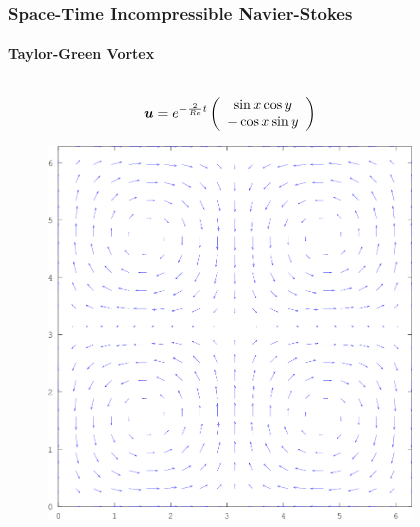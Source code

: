 \documentclass[18pt,xcolor=table]{beamer}
\begin{document}
\begin{frame}[t]
\frametitle{Space-Time Incompressible Navier-Stokes}
\framesubtitle{Taylor-Green Vortex}
\vspace{-7ex}
\begin{columns}
\begin{column}{0.4\textwidth}
\[
\boldsymbol u=e^{-\frac{2}{Re}t}\left( \begin{array}{c} \sin{x}\cos{y}\\ -\cos{x}\sin{y}\\ \end{array} \right)
\]
\begin{figure}
\centering
\includegraphics[width=\textwidth]{Incompressible/TaylorGreen/Taylor-Green_vortex_vector_plot.png}
\end{figure}
\end{column}
\begin{column}{0.6\textwidth}
\begin{figure}
\centering

\end{figure}
\end{column}
\end{columns}
\end{frame}
\end{document}
